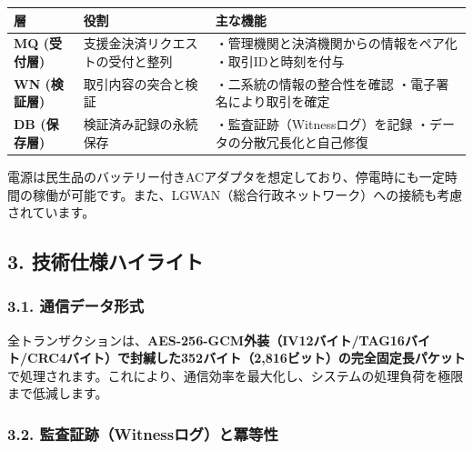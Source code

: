 \documentclass[
  a4paper,
  ja=standard,
  xelatex]{bxjsarticle}
\begin{document}
\begin{longtable}[]{@{}
  >{\raggedright\arraybackslash}p{}
  >{\raggedright\arraybackslash}p{}
  >{\raggedright\arraybackslash}p{}@{}}
\toprule\noalign{}
\begin{minipage}[b]{\linewidth}\raggedright
層
\end{minipage} & \begin{minipage}[b]{\linewidth}\raggedright
役割
\end{minipage} & \begin{minipage}[b]{\linewidth}\raggedright
主な機能
\end{minipage} \\
\midrule\noalign{}
\endhead
\bottomrule\noalign{}
\endlastfoot
\textbf{MQ (受付層)} & 支援金決済リクエストの受付と整列 &
・管理機関と決済機関からの情報をペア化 ・取引IDと時刻を付与 \\
\textbf{WN (検証層)} & 取引内容の突合と検証 &
・二系統の情報の整合性を確認 ・電子署名により取引を確定 \\
\textbf{DB (保存層)} & 検証済み記録の永続保存 &
・監査証跡（Witnessログ）を記録 ・データの分散冗長化と自己修復 \\
\end{longtable}

電源は民生品のバッテリー付きACアダプタを想定しており、停電時にも一定時間の稼働が可能です。また、LGWAN（総合行政ネットワーク）への接続も考慮されています。

\subsection{\texorpdfstring{\textbf{3.
技術仕様ハイライト}}{3. 技術仕様ハイライト}}\label{ux6280ux8853ux4ed5ux69d8ux30cfux30a4ux30e9ux30a4ux30c8}

\subsubsection{\texorpdfstring{\textbf{3.1.
通信データ形式}}{3.1. 通信データ形式}}\label{ux901aux4fe1ux30c7ux30fcux30bfux5f62ux5f0f}

全トランザクションは、\textbf{AES-256-GCM外装（IV12バイト/TAG16バイト/CRC4バイト）で封緘した352バイト（2,816ビット）の完全固定長パケット}で処理されます。これにより、通信効率を最大化し、システムの処理負荷を極限まで低減します。

\subsubsection{\texorpdfstring{\textbf{3.2.
監査証跡（Witnessログ）と冪等性}}{3.2. 監査証跡（Witnessログ）と冪等性}}\label{ux76e3ux67fbux8a3cux8de1witnessux30edux30b0ux3068ux51aaux7b49ux6027}
\end{document}
